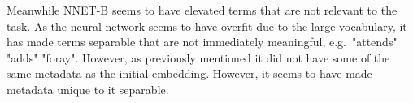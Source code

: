 Meanwhile NNET-B seems to have elevated terms that are not relevant to the task. As the neural network seems to have overfit due to the large vocabulary, it has made terms separable that are not immediately meaningful, e.g.\ "attends" "adds" "foray". However, as previously mentioned it did  not have some of the same metadata as the initial embedding. However, it seems to have made metadata unique to it separable. 


